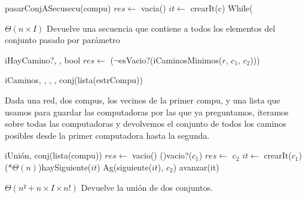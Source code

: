 \begin{Algoritmos}
	\begin{algoritmo}{pasarConjASecu}{}{secu(compu)}{}
		$res \gets$ vacia()
		 $it \gets$ crearIt(c)
		While(
	\end{algoritmo}    
  \datosAlgoritmo{} %
  {} %
  {} %
  {$\Theta(n \times I)$} %
  {Devuelve una secuencia que contiene a todos los elementos del conjunto pasado por par\'{a}metro} %
     
  \begin{algoritmo}{iHayCamino?}{, , }{bool}{}
    $res \gets$ ($\neg$esVacio?(iCaminosMinimos($r$, $c_{1}$, $c_{2}$)))
  \end{algoritmo}
  \datosAlgoritmo{} %
  {} %
  {} %
  {} %
  {} %

  \begin{algoritmo}{iCaminos}{, , , , }{conj(lista(estrCompu))}{}
  \end{algoritmo}
  \datosAlgoritmo{} %
  {} %
  {} %
  {} %
  {Dada una red, dos compus, los vecinos de la primer compu, y una lista que usamos para guardar las computadoras por las que ya preguntamos, iteramos sobre todas las computadoras y devolvemos el conjunto de todos los caminos posibles desde la primer computadora hasta la segunda. } %

  \begin{algoritmo}{iUni\'{o}n}{, }{conj(lista(compu))}
    $res \gets$ vacio()     
    \eIf(){vacio?($c_{1}$)}{
      $res \gets$ $c_{2}$ 
      }{
       $it \gets$ crearIt($c_{1}$)     
      \While(\com[f]*{$\Theta(n)$}){haySiguiente($it$)}{
        Ag(siguiente($it$), $c_{2}$)
        avanzar(it)
      } 
    }
  \end{algoritmo}
  \datosAlgoritmo{} %
  {} %
  {} %
  {$\Theta(n² + n \times I \times n!)$} %
  {Devuelve la uni\'{o}n de dos conjuntos. } %


\end{Algoritmos}
